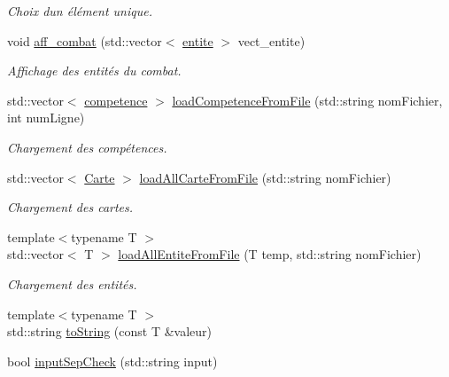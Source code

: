 \begin{DoxyCompactItemize}
\begin{DoxyCompactList}\small\item\em Choix d\textquotesingle{}un élément unique. \end{DoxyCompactList}\item 
void \hyperlink{namespaceio_aea8dfd5fea1f29722c77b31ef7b0b940}{aff\+\_\+combat} (std\+::vector$<$ \hyperlink{classentite}{entite} $>$ vect\+\_\+entite)
\begin{DoxyCompactList}\small\item\em Affichage des entités du combat. \end{DoxyCompactList}\item 
std\+::vector$<$ \hyperlink{classcompetence}{competence} $>$ \hyperlink{namespaceio_a9297653474b9ce9930d6a3862401e751}{load\+Competence\+From\+File} (std\+::string nom\+Fichier, int num\+Ligne)
\begin{DoxyCompactList}\small\item\em Chargement des compétences. \end{DoxyCompactList}\item 
std\+::vector$<$ \hyperlink{class_carte}{Carte} $>$ \hyperlink{namespaceio_abb49308ca24862cc2b64c8c15949af44}{load\+All\+Carte\+From\+File} (std\+::string nom\+Fichier)
\begin{DoxyCompactList}\small\item\em Chargement des cartes. \end{DoxyCompactList}\item 
{\footnotesize template$<$typename T $>$ }\\std\+::vector$<$ T $>$ \hyperlink{namespaceio_a97ddce5128c7df7d67966208e2c37c4c}{load\+All\+Entite\+From\+File} (T temp, std\+::string nom\+Fichier)
\begin{DoxyCompactList}\small\item\em Chargement des entités. \end{DoxyCompactList}\item 
{\footnotesize template$<$typename T $>$ }\\std\+::string \hyperlink{namespaceio_adfc4ec23f63d0f743773a584f0a5826f}{to\+String} (const T \&valeur)
\item 
bool \hyperlink{namespaceio_ad825d53d81ddd635e3875dfb9d54f627}{input\+Sep\+Check} (std\+::string input)
\end{DoxyCompactItemize}
